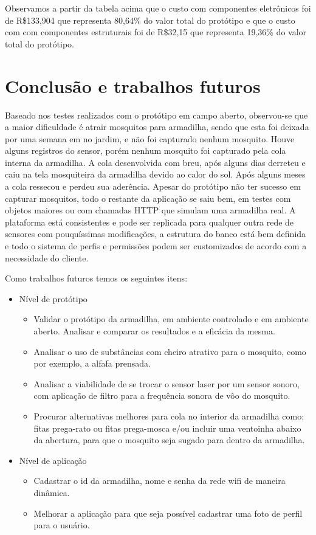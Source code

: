 \documentclass[
	12pt,				%
	openright,			%
	oneside,			%
	a4paper,			%
	chapter=TITLE,		%
	english,			%
	brazil				%
	]{abntex2}
\begin{document}
Observamos a partir da tabela acima que o custo com componentes eletrônicos foi de R\$133,904 que representa 80,64\% do valor total do protótipo e que o custo com 
com componentes estruturais foi de R\$32,15 que representa 19,36\% do valor total do protótipo.

\chapter{Conclusão e trabalhos futuros}

Baseado nos testes realizados com o protótipo em campo aberto, observou-se que a maior dificuldade é atrair mosquitos para armadilha, sendo que esta foi deixada por uma semana em
no jardim, e não foi capturado nenhum mosquito. Houve alguns registros do  sensor, porém nenhum mosquito foi capturado pela cola interna da armadilha. A cola desenvolvida com breu,
após alguns dias derreteu e caiu na tela mosquiteira da armadilha devido ao calor do sol. Após alguns meses a cola ressecou e perdeu sua aderência. Apesar do protótipo
não ter sucesso em capturar mosquitos, todo o restante da aplicação se saiu bem, em testes com objetos maiores ou com chamadas HTTP que simulam uma armadilha real. A plataforma está 
consistentes e pode ser replicada para qualquer outra rede de sensores com pouquíssimas modificações, a estrutura do banco está bem definida e todo o sistema de perfis e 
permissões podem ser customizados de acordo com a necessidade do cliente.

Como trabalhos futuros temos os seguintes itens: 

\begin{itemize}
    \item Nível de protótipo
    \begin{itemize}
        \item Validar o protótipo da armadilha, em ambiente controlado e em ambiente aberto. Analisar e comparar os resultados e a eficácia da mesma.
        \item Analisar o uso de substâncias com cheiro atrativo para o mosquito, como por exemplo, a alfafa prensada.
        \item Analisar a viabilidade de se trocar o sensor laser por um sensor sonoro, com aplicação de filtro para a frequência sonora de vôo do mosquito.
        \item Procurar alternativas melhores para cola no interior da armadilha como: fitas prega-rato ou fitas prega-mosca e/ou incluir uma 
        ventoinha abaixo da abertura, para que o mosquito seja sugado para dentro da armadilha.
    \end{itemize}
    \item Nível de aplicação
    \begin{itemize}
        \item Cadastrar o id da armadilha, nome e senha da rede wifi de maneira dinâmica.
        \item Melhorar a aplicação para que seja possível cadastrar uma foto de perfil para o usuário.
    \end{itemize}   
\end{itemize}
\end{document}
